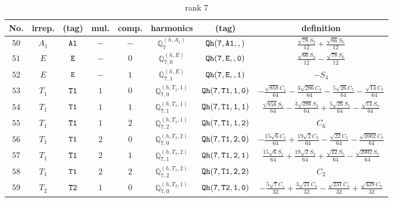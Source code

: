 \documentclass[fleqn,8pt]{jsarticle}
\begin{document}
\begin{table}[ht!]
\begin{center}
\caption{rank 7}
\renewcommand{\arraystretch}{1.3}
\begin{tabular}{cccccccc} \hline \hline
No. & irrep. & (tag) & mul. & comp. & harmonics & (tag) & definition \\ \hline
$ 50 $ & $ A_{1} $ & $ {\tt A1} $ & $ - $ & $ - $ & $ \mathbb{Q}_{7}^{(h,A_{1})} $ & $ {\tt Qh(7,A1,,)} $ & $ \frac{\sqrt{78} S_{2}}{12} + \frac{\sqrt{66} S_{6}}{12} $ \\
$ 51 $ & $ E $ & $ {\tt E} $ & $ - $ & $ 0 $ & $ \mathbb{Q}_{7,0}^{(h,E)} $ & $ {\tt Qh(7,E,,0)} $ & $ \frac{\sqrt{66} S_{2}}{12} - \frac{\sqrt{78} S_{6}}{12} $ \\
$ 52 $ & $ E $ & $ {\tt E} $ & $ - $ & $ 1 $ & $ \mathbb{Q}_{7,1}^{(h,E)} $ & $ {\tt Qh(7,E,,1)} $ & $ - S_{4} $ \\
$ 53 $ & $ T_{1} $ & $ {\tt T1} $ & $ 1 $ & $ 0 $ & $ \mathbb{Q}_{7,0}^{(h,T_{1},1)} $ & $ {\tt Qh(7,T1,1,0)} $ & $ - \frac{\sqrt{858} C_{1}}{64} - \frac{3 \sqrt{286} C_{3}}{64} - \frac{5 \sqrt{26} C_{5}}{64} - \frac{\sqrt{14} C_{7}}{64} $ \\
$ 54 $ & $ T_{1} $ & $ {\tt T1} $ & $ 1 $ & $ 1 $ & $ \mathbb{Q}_{7,1}^{(h,T_{1},1)} $ & $ {\tt Qh(7,T1,1,1)} $ & $ \frac{\sqrt{858} S_{1}}{64} - \frac{3 \sqrt{286} S_{3}}{64} + \frac{5 \sqrt{26} S_{5}}{64} - \frac{\sqrt{14} S_{7}}{64} $ \\
$ 55 $ & $ T_{1} $ & $ {\tt T1} $ & $ 1 $ & $ 2 $ & $ \mathbb{Q}_{7,2}^{(h,T_{1},1)} $ & $ {\tt Qh(7,T1,1,2)} $ & $ C_{6} $ \\
$ 56 $ & $ T_{1} $ & $ {\tt T1} $ & $ 2 $ & $ 0 $ & $ \mathbb{Q}_{7,0}^{(h,T_{1},2)} $ & $ {\tt Qh(7,T1,2,0)} $ & $ - \frac{15 \sqrt{6} C_{1}}{64} + \frac{19 \sqrt{2} C_{3}}{64} - \frac{\sqrt{22} C_{5}}{64} - \frac{\sqrt{2002} C_{7}}{64} $ \\
$ 57 $ & $ T_{1} $ & $ {\tt T1} $ & $ 2 $ & $ 1 $ & $ \mathbb{Q}_{7,1}^{(h,T_{1},2)} $ & $ {\tt Qh(7,T1,2,1)} $ & $ \frac{15 \sqrt{6} S_{1}}{64} + \frac{19 \sqrt{2} S_{3}}{64} + \frac{\sqrt{22} S_{5}}{64} - \frac{\sqrt{2002} S_{7}}{64} $ \\
$ 58 $ & $ T_{1} $ & $ {\tt T1} $ & $ 2 $ & $ 2 $ & $ \mathbb{Q}_{7,2}^{(h,T_{1},2)} $ & $ {\tt Qh(7,T1,2,2)} $ & $ C_{2} $ \\
$ 59 $ & $ T_{2} $ & $ {\tt T2} $ & $ 1 $ & $ 0 $ & $ \mathbb{Q}_{7,0}^{(h,T_{2},1)} $ & $ {\tt Qh(7,T2,1,0)} $ & $ - \frac{5 \sqrt{7} C_{1}}{32} + \frac{3 \sqrt{21} C_{3}}{32} - \frac{\sqrt{231} C_{5}}{32} + \frac{\sqrt{429} C_{7}}{32} $ \\

\end{tabular}
\end{center}
\end{table}
\end{document}
